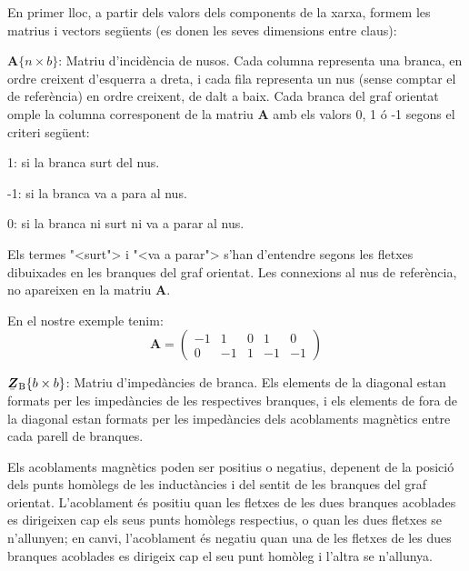 En primer lloc, a partir dels valors dels components de la xarxa, formem les matrius i vectors seg\"{u}ents (es donen les seves dimensions entre claus):
\begin{list}{}
{\setlength{\labelwidth}{20mm} \setlength{\leftmargin}{22mm} \setlength{\labelsep}{2mm}}
   \item[$\boldsymbol{A}\{n\times b\}$:] Matriu d'incid\`{e}ncia de nusos. Cada columna representa una branca, en ordre creixent d'esquerra a dreta, i cada fila representa un nus (sense comptar el de refer\`{e}ncia) en ordre creixent, de dalt a baix. Cada branca del graf orientat omple la columna corresponent de la matriu $\boldsymbol{A}$ amb els valors 0, 1 \'{o} -1 segons el criteri seg\"{u}ent:
   \begin{list}{}
   {\setlength{\labelwidth}{7mm} \setlength{\leftmargin}{9mm} \setlength{\labelsep}{2mm}}
      \item[1:]  si la branca surt del nus.
      \item[-1:] si la branca va a para al nus.
      \item[0:]  si la branca ni surt ni va a parar al nus.
   \end{list}
   Els termes {"<}surt{">} i {"<}va a parar{">} s'han d'entendre segons les fletxes dibuixades en les branques del graf orientat. Les connexions al nus de refer\`{e}ncia, no apareixen en la matriu $\boldsymbol{A}$.

   En el nostre exemple tenim:
   \[
      \boldsymbol{A} = \left(\begin{array}{rrrrr} -1 & 1  & 0 &  1 & 0 \\  0 & -1 & 1 & -1 & -1
                   \end{array} \right)
   \]

   \item[$\mcmplx{Z}\ped{B}\{b\times b\}$:] Matriu d'imped\`{a}ncies de branca. Els elements de la diagonal estan formats per les imped\`{a}ncies de les respectives branques, i els elements de fora de la diagonal estan formats per les imped\`{a}ncies dels acoblaments magn\`{e}tics entre cada parell de branques.

   Els acoblaments magn\`{e}tics poden ser positius o negatius, depenent
    de la posici\'{o} dels punts hom\`{o}legs de les induct\`{a}ncies i del sentit
    de les branques del graf orientat. L'acoblament \'{e}s positiu quan les
    fletxes de les dues branques acoblades es dirigeixen cap els seus punts
    hom\`{o}legs respectius, o quan les dues fletxes se n'allunyen; en canvi,
    l'acoblament \'{e}s negatiu quan una de les fletxes de les dues branques
    acoblades es dirigeix cap el seu punt hom\`{o}leg i l'altra se n'allunya.


\end{list}

